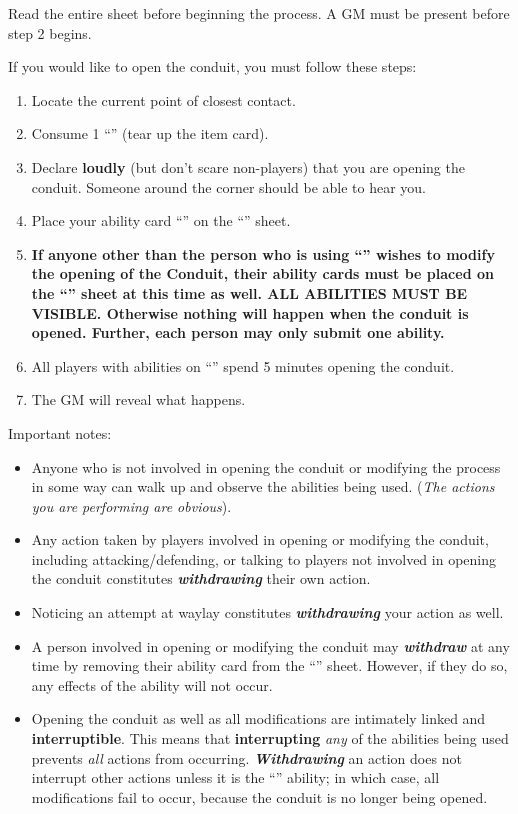 \documentclass[green]{elementals}
\begin{document}
\name{\gConduit{}}

Read the entire sheet before beginning the process. A GM must be present before step 2 begins.


If you would like to open the conduit, you must follow these steps:
\begin{enumerate}
  \item Locate the current point of closest contact.
  \item Consume 1 ``\iBattery{}'' (tear up the item card).
  \item Declare {\bf loudly} (but don't scare non-players) that you are opening the conduit. Someone around the corner should be able to hear you.
  \item Place your ability card ``\aWorkConduit{}'' on the ``\gConduitModifier{}'' sheet.
  \item {\bf If anyone other than the person who is using ``\aWorkConduit{}'' wishes to modify the opening of the Conduit, their ability cards must be placed on the ``\gConduitModifier{}'' sheet at this time as well. ALL ABILITIES MUST BE VISIBLE. Otherwise nothing will happen when the conduit is opened. Further, each person may only submit {\bf one} ability.}
  \item All players with abilities on ``\gConduitModifier{}'' spend 5 minutes opening the conduit.
  \item The GM will reveal what happens.
\end{enumerate}

Important notes:
\begin{itemize}
  \item Anyone who is not involved in opening the conduit or modifying the process in some way can walk up and observe the abilities being used. (\emph{The actions you are performing are obvious}).
  \item Any action taken by players involved in opening or modifying the conduit, including attacking/defending, or talking to players not involved in opening the conduit constitutes {\bf \emph{withdrawing}} their own action.
  \item Noticing an attempt at waylay constitutes {\bf \emph{withdrawing}} your action as well.
  \item A person involved in opening or modifying the conduit may {\bf \emph{withdraw}} at any time by removing their ability card from the ``\gConduitModifier{}'' sheet. However, if they do so, any effects of the ability will not occur.
  \item Opening the conduit as well as all modifications are intimately linked and {\bf interruptible}. This means that {\bf interrupting} \emph{any} of the abilities being used prevents \emph{all} actions from occurring. {\bf \emph{Withdrawing}} an action does not interrupt other actions unless it is the ``\aWorkConduit{}'' ability; in which case, all modifications fail to occur, because the conduit is no longer being opened.
\end{itemize}
\end{document}
